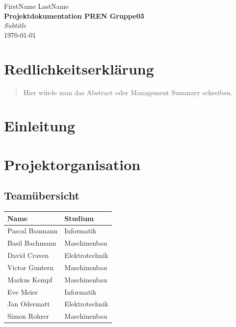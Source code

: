 \documentclass[a4paper]{report}
\newcommand*{\titleAP}{\begingroup %
	\centering
	\vspace*{\baselineskip} %

	{\Large FirstName LastName}\\[0.167\textheight] %

	{\Huge\bfseries Projektdokumentation PREN Gruppe03}\\[\baselineskip]

	{\Large \textit{Subtitle}}\\
	\today

	\vspace*{3\baselineskip} %
	\endgroup}
\begin{document}
\titleAP

\newpage

\chapter*{Redlichkeitserklärung}

\newpage

\begin{abstract}
	Hier würde man das Abstract oder Management Summary schreiben.
\end{abstract}

\tableofcontents

\newpage

\chapter{Einleitung}
\label{ch:Intro}

\chapter{Projektorganisation}

\section{Teamübersicht}

\begin{tabular}{|p{}|p{}|}
	\hline
	\textbf{Name} & \textbf{Studium} \\
	\hline
	Pascal Baumann & Informatik \\
	\hline
	Basil Bachmann & Maschinenbau \\
	\hline
	David Craven & Elektrotechnik \\
	\hline
	Victor Guntern & Maschinenbau \\
	\hline
	Markus Kempf & Maschinenbau \\
	\hline
	Eve Meier & Informatik \\
	\hline
	Jan Odermatt & Elektrotechnik \\
	\hline
	Simon Rohrer & Maschinenbau \\
	\hline
\end{tabular}
\end{document}
